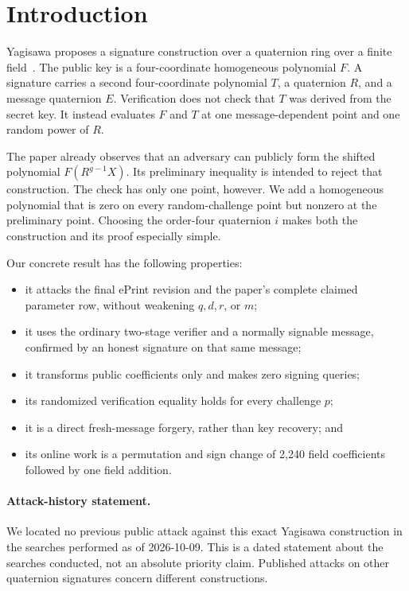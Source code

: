 \documentclass[10pt,a4paper]{article}
\begin{document}
\section{Introduction}

Yagisawa proposes a signature construction over a quaternion ring over a
finite field~\cite{yagisawa}.  The public key is a four-coordinate homogeneous
polynomial $F$.  A signature carries a second four-coordinate polynomial $T$,
a quaternion $R$, and a message quaternion $E$.  Verification does not check
that $T$ was derived from the secret key.  It instead evaluates $F$ and $T$ at
one message-dependent point and one random power of $R$.

The paper already observes that an adversary can publicly form the shifted
polynomial $F(R^{g-1}X)$.  Its preliminary inequality is intended to reject
that construction.  The check has only one point, however.  We add a
homogeneous polynomial that is zero on every random-challenge point but
nonzero at the preliminary point.  Choosing the order-four quaternion $i$
makes both the construction and its proof especially simple.

Our concrete result has the following properties:
\begin{itemize}
  \item it attacks the final ePrint revision and the paper's complete claimed
  parameter row, without weakening $q,d,r$, or $m$;
  \item it uses the ordinary two-stage verifier and a normally signable
  message, confirmed by an honest signature on that same message;
  \item it transforms public coefficients only and makes zero signing queries;
  \item its randomized verification equality holds for every challenge $p$;
  \item it is a direct fresh-message forgery, rather than key recovery; and
  \item its online work is a permutation and sign change of 2,240 field
  coefficients followed by one field addition.
\end{itemize}

\paragraph{Attack-history statement.}
We located no previous public attack against this exact Yagisawa construction
in the searches performed as of 2026-10-09.  This is a dated statement about
the searches conducted, not an absolute priority claim.  Published attacks on
other quaternion signatures concern different constructions.
\end{document}
